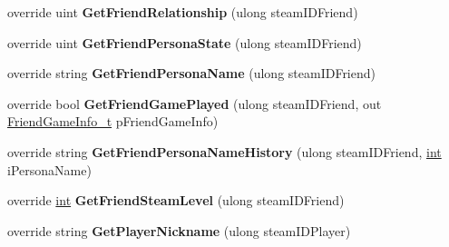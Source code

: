 \begin{DoxyCompactItemize}
\item 
\hypertarget{classValve_1_1Steamworks_1_1CSteamFriends_a37818e73002da18a173b4eb88adab3c0}{}override uint {\bfseries Get\+Friend\+Relationship} (ulong steam\+I\+D\+Friend)\label{classValve_1_1Steamworks_1_1CSteamFriends_a37818e73002da18a173b4eb88adab3c0}

\item 
\hypertarget{classValve_1_1Steamworks_1_1CSteamFriends_a786b09ef13ba297d5624af18d08fac78}{}override uint {\bfseries Get\+Friend\+Persona\+State} (ulong steam\+I\+D\+Friend)\label{classValve_1_1Steamworks_1_1CSteamFriends_a786b09ef13ba297d5624af18d08fac78}

\item 
\hypertarget{classValve_1_1Steamworks_1_1CSteamFriends_a819c4ab3ae3b222aa8abea4ec14bd550}{}override string {\bfseries Get\+Friend\+Persona\+Name} (ulong steam\+I\+D\+Friend)\label{classValve_1_1Steamworks_1_1CSteamFriends_a819c4ab3ae3b222aa8abea4ec14bd550}

\item 
\hypertarget{classValve_1_1Steamworks_1_1CSteamFriends_a75eb12a588209e08ce6206e1d3d29532}{}override bool {\bfseries Get\+Friend\+Game\+Played} (ulong steam\+I\+D\+Friend, out \hyperlink{structValve_1_1Steamworks_1_1FriendGameInfo__t}{Friend\+Game\+Info\+\_\+t} p\+Friend\+Game\+Info)\label{classValve_1_1Steamworks_1_1CSteamFriends_a75eb12a588209e08ce6206e1d3d29532}

\item 
\hypertarget{classValve_1_1Steamworks_1_1CSteamFriends_a847a178c7b9f26d2bcbe69686624f273}{}override string {\bfseries Get\+Friend\+Persona\+Name\+History} (ulong steam\+I\+D\+Friend, \hyperlink{SDL__thread_8h_a6a64f9be4433e4de6e2f2f548cf3c08e}{int} i\+Persona\+Name)\label{classValve_1_1Steamworks_1_1CSteamFriends_a847a178c7b9f26d2bcbe69686624f273}

\item 
\hypertarget{classValve_1_1Steamworks_1_1CSteamFriends_ae9869ef23939fdf32a85763f3ff1373d}{}override \hyperlink{SDL__thread_8h_a6a64f9be4433e4de6e2f2f548cf3c08e}{int} {\bfseries Get\+Friend\+Steam\+Level} (ulong steam\+I\+D\+Friend)\label{classValve_1_1Steamworks_1_1CSteamFriends_ae9869ef23939fdf32a85763f3ff1373d}

\item 
\hypertarget{classValve_1_1Steamworks_1_1CSteamFriends_ac92d15da6ce8993155b8e538a19a0bab}{}override string {\bfseries Get\+Player\+Nickname} (ulong steam\+I\+D\+Player)\label{classValve_1_1Steamworks_1_1CSteamFriends_ac92d15da6ce8993155b8e538a19a0bab}


\end{DoxyCompactItemize}

